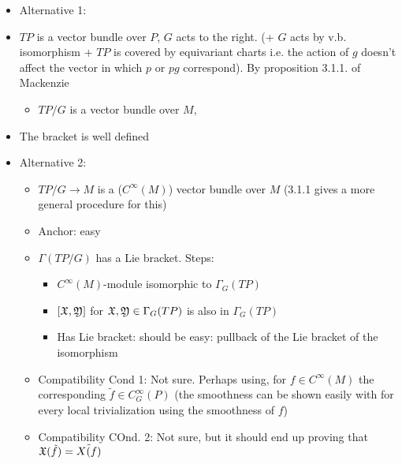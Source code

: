 \begin{itemize}
    \item Alternative 1: 
        \item $TP$ is a vector bundle over $P$, $G$ acts to the right. (+ $G$ acts by v.b. isomorphism + $TP$ is covered by equivariant charts i.e. the action of $g$ doesn't affect the vector in which $p$ or $pg$ correspond). By proposition 3.1.1. of Mackenzie 
        \begin{itemize}
            \item $TP/G$ is a vector bundle over $M$,
        \end{itemize}  
        \item The bracket is well defined
    \item Alternative 2:
    \begin{itemize}
        \item $TP/G \to M$ is a ($C^\infty(M)$) vector bundle over $M$ (3.1.1 gives a more general procedure for this)
        \item Anchor: easy
        \item $\Gamma(TP/G)$ has a Lie bracket. Steps:
        \begin{itemize}
            \item $C^\infty(M)$-module isomorphic to $\Gamma_G(TP)$
            \item $[\mathfrak{X}, \mathfrak{Y}]$ for $\mathfrak{X}, \mathfrak{Y} \in \Gamma_G(TP)$ is also in $\Gamma_G(TP)$
            \item Has Lie bracket: should be easy: pullback of the Lie bracket of the isomorphism
        \end{itemize}
        
        \item Compatibility Cond 1: Not sure. Perhaps using, for $f \in C^\infty(M)$ the corresponding $\tilde f \in C_G^\infty(P)$ (the smoothness can be shown easily with for every local trivialization using the smoothness of $f$)
        
        \item Compatibility COnd. 2: Not sure, but it should end up proving that $\mathfrak{X} (\tilde f) = \Tilde{X(f)}$
    \end{itemize}
\end{itemize}


